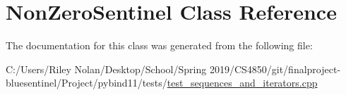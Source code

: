 \hypertarget{class_non_zero_sentinel}{}\section{Non\+Zero\+Sentinel Class Reference}
\label{class_non_zero_sentinel}


The documentation for this class was generated from the following file\+:\begin{DoxyCompactItemize}
\item 
C\+:/\+Users/\+Riley Nolan/\+Desktop/\+School/\+Spring 2019/\+C\+S4850/git/finalproject-\/bluesentinel/\+Project/pybind11/tests/\mbox{\hyperlink{test__sequences__and__iterators_8cpp}{test\+\_\+sequences\+\_\+and\+\_\+iterators.\+cpp}}\end{DoxyCompactItemize}
